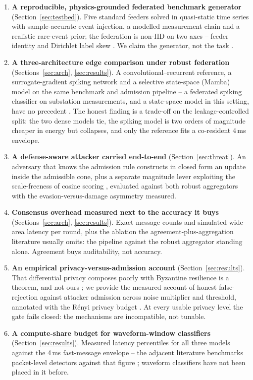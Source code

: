 \begin{enumerate}\setlength{\itemsep}{1pt}
\item \textbf{A reproducible, physics-grounded federated benchmark
  generator} (Section~\ref{sec:testbed}). Five standard feeders solved
  in quasi-static time series with sample-accurate event injection, a
  modelled measurement chain and a realistic rare-event prior; the
  federation is non-IID on two axes -- feeder identity and Dirichlet
  label skew \cite{hsu2019}. We claim the generator, not the task
  \cite{husnoo2023fedisa,husnoo2023feddisc,li2025fdia}.
\item \textbf{A three-architecture edge comparison under robust
  federation} (Sections~\ref{sec:arch}, \ref{sec:results}). A
  convolutional--recurrent reference, a surrogate-gradient spiking
  network and a selective state-space (Mamba) model on the same
  benchmark and admission pipeline -- a federated spiking classifier on
  substation measurements, and a state-space model in this setting, have
  no precedent \cite{venkatesha2021,nguyen2025robust,mahapatra2021}. The
  honest finding is a trade-off on the leakage-controlled split: the two
  dense models tie, the spiking model is two orders of magnitude cheaper
  in energy but collapses, and only the reference fits a co-resident
  4\,ms envelope.
\item \textbf{A defense-aware attacker carried end-to-end}
  (Section~\ref{sec:threat}). An adversary that knows the admission rule
  constructs in closed form an update inside the admissible cone, plus a
  separate magnitude lever exploiting the scale-freeness of cosine
  scoring \cite{fang2020,shejwalkar2021,baruch2019,xie2019}, evaluated
  against both robust aggregators with the evasion-versus-damage
  asymmetry measured.
\item \textbf{Consensus overhead measured next to the accuracy it buys}
  (Sections~\ref{sec:arch}, \ref{sec:results}). Exact message counts and
  simulated wide-area latency per round, plus the ablation the
  agreement-plus-aggregation literature \cite{kfc2025,li2024brfl}
  usually omits: the pipeline against the robust aggregator standing
  alone. Agreement buys auditability, not accuracy.
\item \textbf{An empirical privacy-versus-admission account}
  (Section~\ref{sec:results}). That differential privacy composes poorly
  with Byzantine resilience is a theorem, and not ours
  \cite{guerraoui2021podc}; we provide the
  measured account of honest false-rejection against attacker admission
  across noise multiplier and threshold, annotated with the R\'enyi
  privacy budget \cite{mironov2017}. At every usable privacy level the
  gate fails closed: the mechanisms are incompatible, not tunable.
\item \textbf{A compute-share budget for waveform-window classifiers}
  (Section~\ref{sec:results}). Measured latency percentiles for all
  three models against the 4\,ms fast-message envelope -- the adjacent
  literature benchmarks packet-level detectors against that figure
  \cite{ustun2021,moore2026}; waveform classifiers have not been placed
  in it before.
\end{enumerate}

